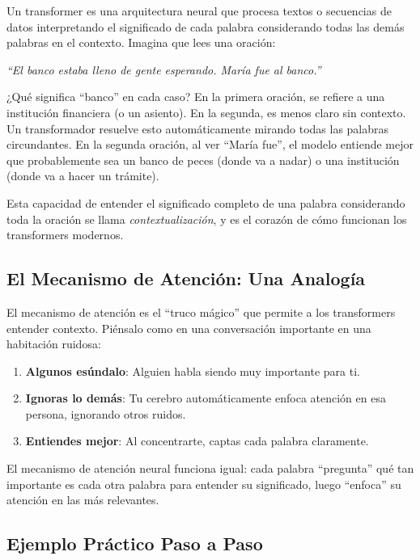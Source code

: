 \documentclass[11pt,a4paper]{article}
\begin{document}
Un transformer es una arquitectura neural que procesa textos o secuencias de datos interpretando el significado de cada palabra considerando todas las demás palabras en el contexto. Imagina que lees una oración:

\begin{center}
\textit{``El banco estaba lleno de gente esperando. María fue al banco.''}
\end{center}

¿Qué significa ``banco'' en cada caso? En la primera oración, se refiere a una institución financiera (o un asiento). En la segunda, es menos claro sin contexto. Un transformador resuelve esto automáticamente mirando todas las palabras circundantes. En la segunda oración, al ver ``María fue'', el modelo entiende mejor que probablemente sea un banco de peces (donde va a nadar) o una institución (donde va a hacer un trámite).

Esta capacidad de entender el significado completo de una palabra considerando toda la oración se llama \emph{contextualización}, y es el corazón de cómo funcionan los transformers modernos.

\subsection{El Mecanismo de Atención: Una Analogía}

El mecanismo de atención es el ``truco mágico'' que permite a los transformers entender contexto. Piénsalo como en una conversación importante en una habitación ruidosa:

\begin{enumerate}[leftmargin=*]
    \item \textbf{Algunos esúndalo}: Alguien habla siendo muy importante para ti.
    \item \textbf{Ignoras lo demás}: Tu cerebro automáticamente enfoca atención en esa persona, ignorando otros ruidos.
    \item \textbf{Entiendes mejor}: Al concentrarte, captas cada palabra claramente.
\end{enumerate}

El mecanismo de atención neural funciona igual: cada palabra ``pregunta'' qué tan importante es cada otra palabra para entender su significado, luego ``enfoca'' su atención en las más relevantes.

\subsection{Ejemplo Práctico Paso a Paso}
\end{document}
